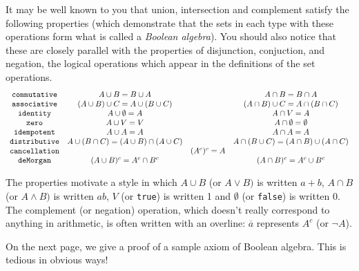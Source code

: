 \documentclass[12pt]{book}
\begin{document}
It may be well known to you that union, intersection and complement satisfy the following properties (which demonstrate that the sets in each type with these operations form what is called a {\em Boolean algebra\/}).  You should also notice that these are closely parallel with the properties of disjunction, conjuction, and negation, the logical operations which appear in the definitions of the set operations.
{\tiny
$$\begin{array}{cccc}

{\tt commutative} & A\cup B = B \cup A& & A \cap B = B \cap A \\

{\tt associative}  & (A \cup B) \cup C = A \cup (B \cup C) & & (A \cap B) \cup C = A \cap (B \cap C) \\

{\tt identity}  &  A \cup \emptyset = A& & A \cap V = A \\

{\tt zero} & A \cup V = V & & A \cap \emptyset = \emptyset \\

{\tt idempotent} & A \cup A = A & & A \cap A = A \\

{\tt distributive} & A \cup (B \cap C) = (A \cup B) \cap (A \cup C)& & A \cap (B \cup C) = (A \cap B) \cup (A \cap C) \\

{\tt cancellation} & & (A^c)^c=A&  \\

{\tt deMorgan} & (A \cup B)^c = A^c \cap B^c & & (A \cap B)^c = A^c \cup B^c \\


\end{array}$$}

The properties motivate a style in which $A \cup B$ (or $A \vee B)$ is written $a + b$,  $A \cap B$ (or $A \wedge B)$ is written $ab$, $V$ (or {\tt true}) is written 1
and $\emptyset$ (or {\tt false}) is written 0.  The complement (or negation) operation, which doesn't really correspond to anything in arithmetic, is often written with an overline:  $\overline{a}$ represents $A^c$ (or $\neg A$).

On the next page, we give a proof of a sample  axiom of Boolean algebra.  This is tedious in obvious ways!

\newpage
\end{document}
